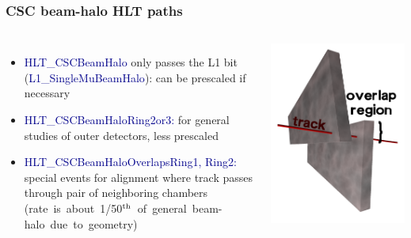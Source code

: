 \documentclass[compress]{beamer}
\begin{document}
\begin{frame}
\frametitle{CSC beam-halo HLT paths}

\begin{columns}

\begin{itemize}
\item \textcolor{darkblue}{HLT\_CSCBeamHalo} only passes the L1 bit (\textcolor{darkblue}{L1\_SingleMuBeamHalo}): can be prescaled if \mbox{necessary\hspace{-1 cm}}
\item \textcolor{darkblue}{HLT\_CSCBeamHaloRing2or3:} for general studies of outer detectors, less prescaled
\item \textcolor{darkblue}{HLT\_CSCBeamHaloOverlapsRing1, Ring2:} \\ special events for alignment where track passes through pair of neighboring chambers \\ \mbox{\scriptsize (rate is about 1/50$^{\mbox{\scriptsize th}}$ of general beam-halo due to geometry)}
\end{itemize}


\includegraphics[width=\linewidth]{overlaps.png}
\end{columns}


\end{frame}
\end{document}
